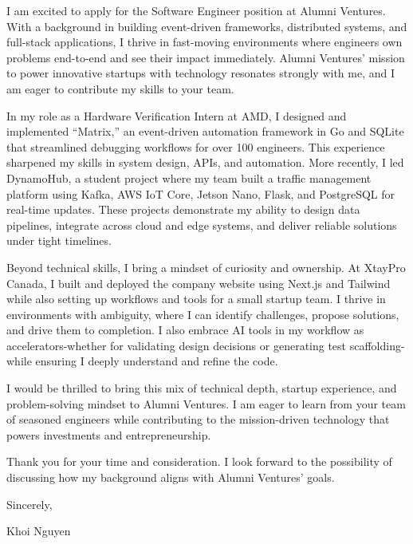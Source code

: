 \documentclass[
	12pt, %
]{resume} %
\begin{document}
I am excited to apply for the Software Engineer position at Alumni Ventures. With a background in building event-driven frameworks, distributed systems, and full-stack applications, I thrive in fast-moving environments where engineers own problems end-to-end and see their impact immediately. Alumni Ventures’ mission to power innovative startups with technology resonates strongly with me, and I am eager to contribute my skills to your team.

In my role as a Hardware Verification Intern at AMD, I designed and implemented “Matrix,” an event-driven automation framework in Go and SQLite that streamlined debugging workflows for over 100 engineers. This experience sharpened my skills in system design, APIs, and automation. More recently, I led DynamoHub, a student project where my team built a traffic management platform using Kafka, AWS IoT Core, Jetson Nano, Flask, and PostgreSQL for real-time updates. These projects demonstrate my ability to design data pipelines, integrate across cloud and edge systems, and deliver reliable solutions under tight timelines.

Beyond technical skills, I bring a mindset of curiosity and ownership. At XtayPro Canada, I built and deployed the company website using Next.js and Tailwind while also setting up workflows and tools for a small startup team. I thrive in environments with ambiguity, where I can identify challenges, propose solutions, and drive them to completion. I also embrace AI tools in my workflow as accelerators-whether for validating design decisions or generating test scaffolding-while ensuring I deeply understand and refine the code.

I would be thrilled to bring this mix of technical depth, startup experience, and problem-solving mindset to Alumni Ventures. I am eager to learn from your team of seasoned engineers while contributing to the mission-driven technology that powers investments and entrepreneurship.

Thank you for your time and consideration. I look forward to the possibility of discussing how my background aligns with Alumni Ventures’ goals.

Sincerely,

Khoi Nguyen
\end{document}
